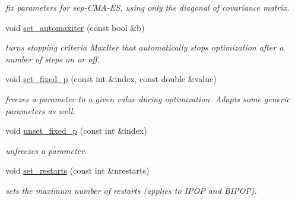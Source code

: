 \begin{DoxyCompactItemize}
\begin{DoxyCompactList}\small\item\em fix parameters for sep-\/\-C\-M\-A-\/\-E\-S, using only the diagonal of covariance matrix. \end{DoxyCompactList}\item 
void \hyperlink{classlibcmaes_1_1CMAParameters_a7fcd592c259dca6716fdbe735fd1b837}{set\-\_\-automaxiter} (const bool \&b)
\begin{DoxyCompactList}\small\item\em turns stopping criteria Max\-Iter that automatically stops optimization after a number of steps on or off. \end{DoxyCompactList}\item 
void \hyperlink{classlibcmaes_1_1CMAParameters_a73af8cdc07dc3388c40a27ddbdea96b4}{set\-\_\-fixed\-\_\-p} (const int \&index, const double \&value)
\begin{DoxyCompactList}\small\item\em freezes a parameter to a given value during optimization. Adapts some generic parameters as well. \end{DoxyCompactList}\item 
void \hyperlink{classlibcmaes_1_1CMAParameters_adb4f043e62081a8910d54f87db3b6ef4}{unset\-\_\-fixed\-\_\-p} (const int \&index)
\begin{DoxyCompactList}\small\item\em unfreezes a parameter. \end{DoxyCompactList}\item 
void \hyperlink{classlibcmaes_1_1CMAParameters_a105789bdd00467411107db57302028f2}{set\-\_\-restarts} (const int \&nrestarts)
\begin{DoxyCompactList}\small\item\em sets the maximum number of restarts (applies to I\-P\-O\-P and B\-I\-P\-O\-P). \end{DoxyCompactList}\end{DoxyCompactItemize}
